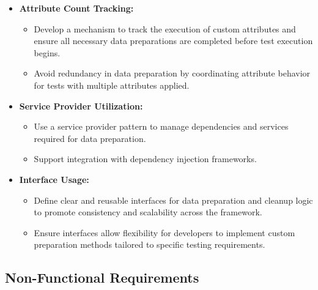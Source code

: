 \begin{itemize}
	\item \textbf{Attribute Count Tracking:}
	      \begin{itemize}
		      \item Develop a mechanism to track the execution of custom attributes and ensure all necessary data preparations are completed before test execution begins.
		      \item Avoid redundancy in data preparation by coordinating attribute behavior for tests with multiple attributes applied.
	      \end{itemize}

	\item \textbf{Service Provider Utilization:}
	      \begin{itemize}
		      \item Use a service provider pattern to manage dependencies and services required for data preparation.
		      \item Support integration with dependency injection frameworks.
	      \end{itemize}
	\item \textbf{Interface Usage:}
	      \begin{itemize}
		      \item Define clear and reusable interfaces for data preparation and cleanup logic to promote consistency and scalability across the framework.
		      \item Ensure interfaces allow flexibility for developers to implement custom preparation methods tailored to specific testing requirements.
	      \end{itemize}
\end{itemize}

\subsection*{Non-Functional Requirements}

